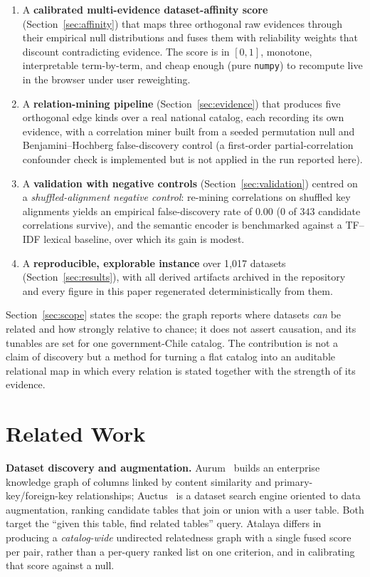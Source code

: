 \documentclass[journal]{IEEEtran}
\begin{document}
\begin{enumerate}
\item A \textbf{calibrated multi-evidence dataset-affinity score} (Section~\ref{sec:affinity}) that maps three
orthogonal raw evidences through their empirical null distributions and fuses them with reliability weights that
discount contradicting evidence. The score is in $[0,1]$, monotone, interpretable term-by-term, and cheap enough
(pure \texttt{numpy}) to recompute live in the browser under user reweighting.
\item A \textbf{relation-mining pipeline} (Section~\ref{sec:evidence}) that produces five orthogonal
edge kinds over a real national catalog, each recording its own evidence, with a correlation miner built from a
seeded permutation null and Benjamini--Hochberg false-discovery control (a first-order partial-correlation
confounder check is implemented but is not applied in the run reported here).
\item A \textbf{validation with negative controls} (Section~\ref{sec:validation}) centred on a
\emph{shuffled-alignment negative control}: re-mining correlations on shuffled key alignments yields an
empirical false-discovery rate of $0.00$ ($0$ of $343$ candidate correlations survive), and the semantic
encoder is benchmarked against a TF--IDF lexical baseline, over which its gain is modest.
\item A \textbf{reproducible, explorable instance} over 1{,}017 datasets (Section~\ref{sec:results}), with all
derived artifacts archived in the repository and every figure in this paper regenerated deterministically from
them.
\end{enumerate}

Section~\ref{sec:scope} states the scope: the graph reports where datasets \emph{can} be related and how
strongly relative to chance; it does not assert causation, and its tunables are set for one government-Chile
catalog. The contribution is not a claim of discovery but a method for turning a flat catalog into an auditable
relational map in which every relation is stated together with the strength of its evidence.

\section{Related Work}\label{sec:related}

\textbf{Dataset discovery and augmentation.} Aurum~\cite{aurum} builds an enterprise knowledge graph of columns
linked by content similarity and primary-key/foreign-key relationships; Auctus~\cite{auctus} is a dataset search
engine oriented to data augmentation, ranking candidate tables that join or union with a user table. Both target
the ``given this table, find related tables'' query. Atalaya differs in producing a \emph{catalog-wide}
undirected relatedness graph with a single fused score per pair, rather than a per-query ranked list on one
criterion, and in calibrating that score against a null.
\end{document}
